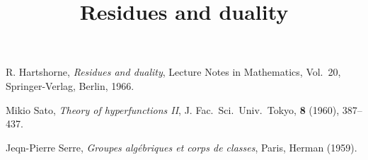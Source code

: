 \documentclass[leqno]{book}
\title{Residues and duality}
\author{}
\theoremstyle{plain}
\theoremstyle{definition}
\theoremstyle{remark}
\numberwithin{equation}{section}
\begin{document}
\maketitle

\frontmatter

\tableofcontents
{}

%
\layout
\mainmatter

%

%
%
%
%
%
%
%
%
%

\backmatter

%
\begin{thebibliography}{20}
    \par
     R. Hartshorne, 
    \textit{Residues and duality}, Lecture Notes in Mathematics, 
    Vol.\ 20, Springer-Verlag, Berlin, 1966.

     Mikio Sato, \textit{Theory of hyperfunctions II}, J. Fac.\ Sci.\ Univ.\ Tokyo, {\bf{8}} (1960), 387--437.

     Jeqn-Pierre Serre, 
    \textit{Groupes alg\'ebriques et corps de classes}, Paris, Herman (1959).

    \end{thebibliography}
\end{document}
